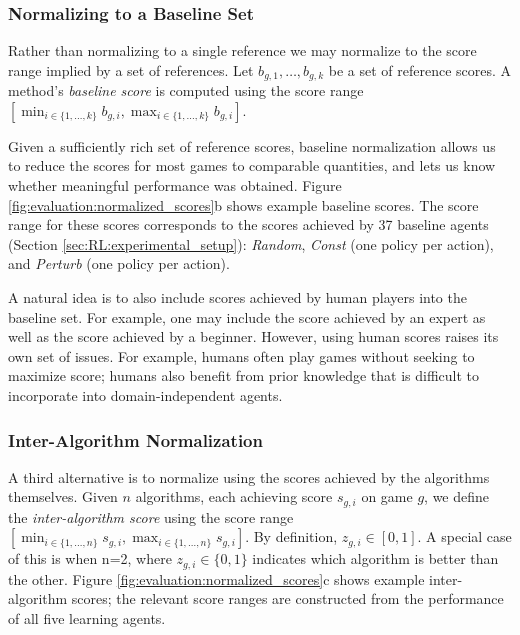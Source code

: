 \documentclass[twoside,11pt]{article}
\begin{document}
\subsubsection{Normalizing to a Baseline Set}

Rather than normalizing to a single reference we may normalize to the score range implied by
a set of references. Let $b_{g,1}, \dots, b_{g,k}$ be a set of reference scores. A 
method's \emph{baseline score} is computed using the score range 
$[ \min_{i \in \{ 1, \dots, k \} } b_{g,i}, \max_{i \in \{1, \dots, k\}} b_{g,i} ]$.


Given a sufficiently rich set of reference scores, baseline normalization allows us to reduce the scores for most games to comparable quantities, and lets us know whether meaningful performance was obtained. 
Figure \ref{fig:evaluation:normalized_scores}b shows example baseline scores. The score range for these scores corresponds to the scores achieved by 37 baseline agents (Section \ref{sec:RL:experimental_setup}): \emph{Random}, \emph{Const} (one policy per action), and \emph{Perturb} (one policy per action). 

A natural idea is to also include scores achieved by human players into the baseline set. 
For example, one may include the score achieved by an expert as well as the score achieved by a beginner. However, using human scores raises its own set of issues. 
For example, humans often play games without seeking to maximize score; humans also benefit from prior knowledge that is difficult to incorporate into domain-independent agents.

\subsubsection{Inter-Algorithm Normalization} 


A third alternative is to normalize using the scores achieved by the algorithms themselves. 
Given $n$ algorithms, each achieving score $s_{g,i}$ on game $g$, we define the 
\emph{inter-algorithm score} using the score range 
$[ \min_{i \in \{ 1, \dots, n \} } s_{g,i}, \max_{i \in \{1, \dots, n\}} s_{g,i} ]$.
By definition, $z_{g,i} \in [0, 1]$. A special case of this is when n=2, where 
$z_{g,i} \in \{0, 1\}$ indicates which algorithm is better than the other.
Figure \ref{fig:evaluation:normalized_scores}c shows example inter-algorithm scores; the 
relevant score ranges are constructed from the performance of all five learning agents. 
\end{document}
